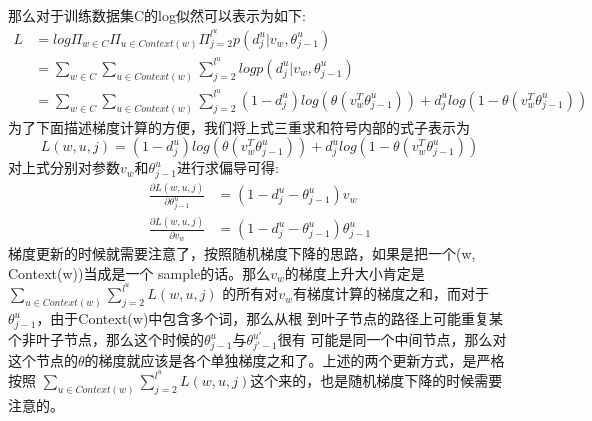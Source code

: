 \documentclass[UTF8]{ctexart}
\begin{document}
\par
那么对于训练数据集C的log似然可以表示为如下:
\begin{align}
L &= log \Pi_{w \in C} \Pi_{u \in Context(w)} \Pi_{j=2}^{l^u} %
p(d_j^u|v_w, \theta_{j-1}^u)
\\
&= \sum_{w \in C} \sum_{u \in Context(w)} \sum_{j=2}^{l^u} %
log p(d_j^u|v_w, \theta_{j-1}^u)
\\
&= \sum_{w \in C} \sum_{u \in Context(w)} \sum_{j=2}^{l^u} %
(1-d_j^u)log(\theta(v_w^T \theta_{j-1}^u)) + %
d_j^u log(1 - \theta(v_w^T \theta_{j-1}^u))
\end{align}
为了下面描述梯度计算的方便，我们将上式三重求和符号内部的式子表示为
\[L(w, u, j) = (1-d_j^u)log(\theta(v_w^T \theta_{j-1}^u)) + %
d_j^u log(1 - \theta(v_w^T \theta_{j-1}^u)) \]
对上式分别对参数$v_w$和$\theta_{j-1}^u$进行求偏导可得:
\begin{align}
\frac{\partial L(w, u, j)}{\partial \theta_{j-1}^u} &= %
(1 - d_j^u - \theta_{j-1}^u)v_w
\\
\frac{\partial L(w, u, j)}{\partial v_w} &= %
(1 - d_j^u - \theta_{j-1}^u)\theta_{j-1}^u
\end{align}
梯度更新的时候就需要注意了，按照随机梯度下降的思路，如果是把一个(w, Context(w))当成是一个
sample的话。那么$v_w$的梯度上升大小肯定是$\sum_{u \in Context(w)} \sum_{j=2}^{l^u} L(w, u, j)$
的所有对$v_w$有梯度计算的梯度之和，而对于$\theta_{j-1}^u$，由于Context(w)中包含多个词，那么从根
到叶子节点的路径上可能重复某个非叶子节点，那么这个时候的$\theta_{j-1}^u$与$\theta_{j'-1}^{u'}$很有
可能是同一个中间节点，那么对这个节点的$\theta$的梯度就应该是各个单独梯度之和了。上述的两个更新方式，是严格按照
$\sum_{u \in Context(w)} \sum_{j=2}^{l^u} L(w, u, j)$这个来的，也是随机梯度下降的时候需要注意的。
\end{document}

